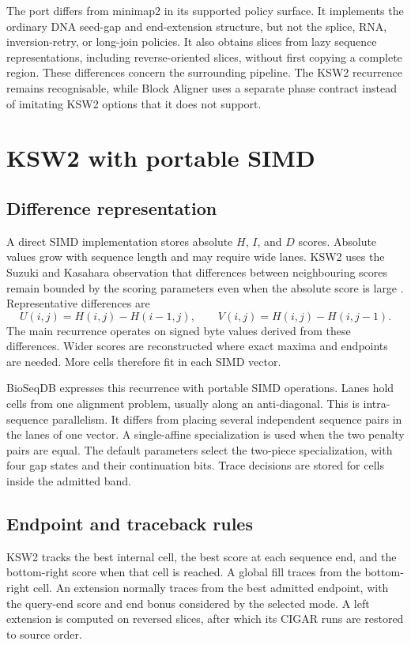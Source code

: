 The port differs from minimap2 in its supported policy surface. It implements
the ordinary DNA seed-gap and end-extension structure, but not the splice,
RNA, inversion-retry, or long-join policies. It also obtains slices from lazy
sequence representations, including reverse-oriented slices, without first
copying a complete region. These differences concern the surrounding
pipeline. The KSW2 recurrence remains recognisable, while Block Aligner uses a
separate phase contract instead of imitating KSW2 options that it does not
support.

\section{KSW2 with portable SIMD}
\label{sec:final-alignment-ksw2}

\subsection{Difference representation}

A direct SIMD implementation stores absolute \(H\), \(I\), and \(D\) scores.
Absolute values grow with sequence length and may require wide lanes. KSW2
uses the Suzuki and Kasahara observation that differences between neighbouring
scores remain bounded by the scoring parameters even when the absolute score
is large \cite{suzuki_kasahara_2018}. Representative differences are
\[
    U(i,j)=H(i,j)-H(i-1,j), \qquad
    V(i,j)=H(i,j)-H(i,j-1).
\]
The main recurrence operates on signed byte values derived from these
differences. Wider scores are reconstructed where exact maxima and endpoints
are needed. More cells therefore fit in each SIMD vector.

BioSeqDB expresses this recurrence with portable SIMD operations. Lanes hold
cells from one alignment problem, usually along an anti-diagonal. This is
intra-sequence parallelism. It differs from placing several independent
sequence pairs in the lanes of one vector. A single-affine specialization is
used when the two penalty pairs are equal. The default parameters select the
two-piece specialization, with four gap states and their continuation bits.
Trace decisions are stored for cells inside the admitted band.

\subsection{Endpoint and traceback rules}

KSW2 tracks the best internal cell, the best score at each sequence end, and
the bottom-right score when that cell is reached. A global fill traces from
the bottom-right cell. An extension normally traces from the best admitted
endpoint, with the query-end score and end bonus considered by the selected
mode. A left extension is computed on reversed slices, after which its CIGAR
runs are restored to source order.

